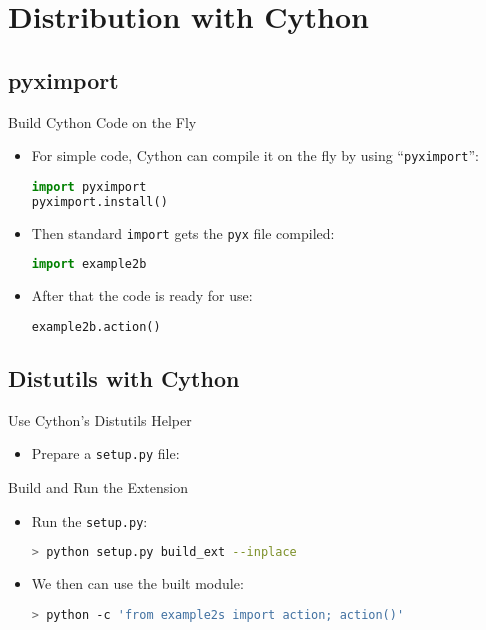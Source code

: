 \documentclass[dvips,xcolor=pst,14pt]{beamer}
\begin{document}
\section{
Distribution with Cython
}

\subsection{
pyximport
}

\begin{frame}[fragile]{
%
Build Cython Code on the Fly
%
}
\begin{itemize}
\item For simple code, Cython can compile it on the fly by using
``{\color{red}\verb+pyximport+}'':
\begin{lstlisting}[language=Python]
import pyximport
pyximport.install()
\end{lstlisting}
\item Then standard \verb+import+ gets the {\color{red}\verb+pyx+} file
compiled:
\begin{lstlisting}[language=Python]
import example2b
\end{lstlisting}
\item After that the code is ready for use:
\begin{lstlisting}[language=Python]
example2b.action()
\end{lstlisting}
\end{itemize}
\end{frame}

\subsection{
Distutils with Cython
}

\begin{frame}[fragile]{
%
Use Cython's Distutils Helper
%
}
\begin{itemize}
\item Prepare a \verb+setup.py+ file:

\end{itemize}
\end{frame}

\begin{frame}[fragile]{
%
Build and Run the Extension
%
}
\begin{itemize}
\item Run the \verb+setup.py+:
\begin{lstlisting}[language=bash]
> python setup.py build_ext --inplace
\end{lstlisting}
\item We then can use the built module:
\begin{lstlisting}[language=bash]
> python -c 'from example2s import action; action()'
\end{lstlisting}
\end{itemize}
\end{frame}
\end{document}
